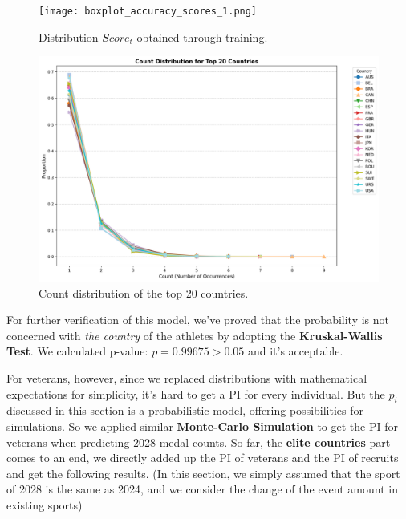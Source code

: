 \documentclass{mcmthesis}
\begin{document}
\begin{figure}[htbp]
    \centering
    \hspace*{0.1\textwidth} %
    \begin{minipage}{0.35\textwidth} %
        \centering
        \texttt{[image: boxplot\_accuracy\_scores\_1.png]}
        \caption{Distribution $Score_t$ obtained through training.}
        \label{fig:p-value_distribution}
    \end{minipage}
    \hfill
    \begin{minipage}{0.4\textwidth} %
        \centering
        \includegraphics[width=\linewidth]{MCM2025_Latex/figures/count_distribution_top_20_countries.png}
        \caption{Count distribution of the top 20 countries.}
        \label{fig:count_distribution_top_20_countries}
    \end{minipage}
    \hspace*{0.1\textwidth} %
\end{figure}


For further verification of this model, we've proved that the probability is not concerned with \textit{the country} of the athletes by adopting the \textbf{Kruskal-Wallis Test}. We calculated p-value: $p = 0.99675 > 0.05$ and it's acceptable.

For veterans, however, since we replaced distributions with mathematical expectations for simplicity, it's hard to get a PI for every individual. But the $p_i$ discussed in this section is a probabilistic model, offering possibilities for simulations. So we applied similar \textbf{Monte-Carlo Simulation} to get the PI for veterans when predicting 2028 medal counts.
So far, the \textbf{elite countries} part comes to an end, we directly added up the PI of veterans and the PI of recruits and get the following results. (In this section, we simply assumed that the sport of 2028 is the same as 2024, and we consider the change of the event amount in existing sports)
\end{document}
